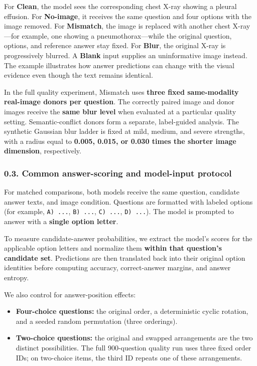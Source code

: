 \documentclass[
  10pt,
  a4paper,
]{article}
\providecommand{\tightlist}{%
  \setlength{\itemsep}{0pt}\setlength{\parskip}{0pt}}
\begin{document}
For \textbf{Clean}, the model sees the corresponding chest X-ray showing
a pleural effusion. For \textbf{No-image}, it receives the same question
and four options with the image removed. For \textbf{Mismatch}, the
image is replaced with another chest X-ray---for example, one showing a
pneumothorax---while the original question, options, and reference
answer stay fixed. For \textbf{Blur}, the original X-ray is
progressively blurred. A \textbf{Blank} input supplies an uninformative
image instead. The example illustrates how answer predictions can change
with the visual evidence even though the text remains identical.

In the full quality experiment, Mismatch uses \textbf{three fixed
same-modality real-image donors per question}. The correctly paired
image and donor images receive the \textbf{same blur level} when
evaluated at a particular quality setting. Semantic-conflict donors form
a separate, label-guided analysis. The synthetic Gaussian blur ladder is
fixed at mild, medium, and severe strengths, with a radius equal to
\textbf{0.005, 0.015, or 0.030 times the shorter image dimension},
respectively.

\subsubsection{0.3. Common answer-scoring and model-input
protocol}\label{common-answer-scoring-and-model-input-protocol}

For matched comparisons, both models receive the same question,
candidate answer texts, and image condition. Questions are formatted
with labeled options (for example, \texttt{A)\ ...}, \texttt{B)\ ...},
\texttt{C)\ ...}, \texttt{D)\ ...}). The model is prompted to answer
with a \textbf{single option letter}.

To measure candidate-answer probabilities, we extract the model's scores
for the applicable option letters and normalize them \textbf{within that
question's candidate set}. Predictions are then translated back into
their original option identities before computing accuracy,
correct-answer margins, and answer entropy.

We also control for answer-position effects:

\begin{itemize}
\tightlist
\item
  \textbf{Four-choice questions:} the original order, a deterministic
  cyclic rotation, and a seeded random permutation (three orderings).
\item
  \textbf{Two-choice questions:} the original and swapped arrangements
  are the two distinct possibilities. The full 900-question quality run
  uses three fixed order IDs; on two-choice items, the third ID repeats
  one of these arrangements.
\end{itemize}
\end{document}
